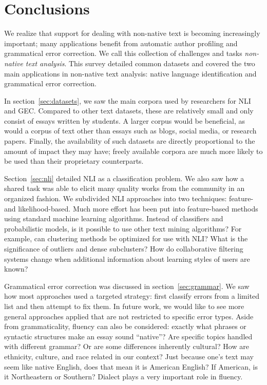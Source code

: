 \section{Conclusions}
\label{sec:conclusion}

We realize that support for dealing with non-native text is becoming
increasingly important; many applications benefit from automatic author
profiling and grammatical error correction. We call this collection of
challenges and tasks \emph{non-native text analysis}. This survey detailed
common datasets and covered the two main applications in non-native text
analysis: native language identification and grammatical error correction.

In section~\ref{sec:datasets}, we saw the main corpora used by researchers for
NLI and GEC. Compared to other text datasets, these are relatively small and
only consist of essays written by students. A larger corpus would be beneficial,
as would a corpus of text other than essays such as blogs, social media, or
research papers. Finally, the availability of such datasets are directly
proportional to the amount of impact they may have; freely available corpora are
much more likely to be used than their proprietary counterparts.

Section~\ref{sec:nli} detailed NLI as a classification problem. We also saw how
a shared task was able to elicit many quality works from the community in an
organized fashion. We subdivided NLI approaches into two techniques: feature-
and likelihood-based. Much more effort has been put into feature-based methods
using standard machine learning algorithms. Instead of classifiers and
probabilistic models, is it possible to use other text mining algorithms? For
example, can clustering methods be optimized for use with NLI? What is the
significance of outliers and dense subclusters? How do collaborative filtering
systems change when additional information about learning styles of users are
known?

Grammatical error correction was discussed in section~\ref{sec:grammar}. We saw
how most approaches used a targeted strategy: first classify errors from a
limited list and then attempt to fix them. In future work, we would like to see
more general approaches applied that are not restricted to specific error types.
Aside from grammaticality, fluency can also be considered: exactly what phrases
or syntactic structures make an essay sound ``native''? Are specific topics
handled with different grammar? Or are some differences inherently cultural?
How are ethnicity, culture, and race related in our context? Just because one's
text may seem like native English, does that mean it is American English? If
American, is it Northeastern or Southern? Dialect plays a very important role
in fluency.

